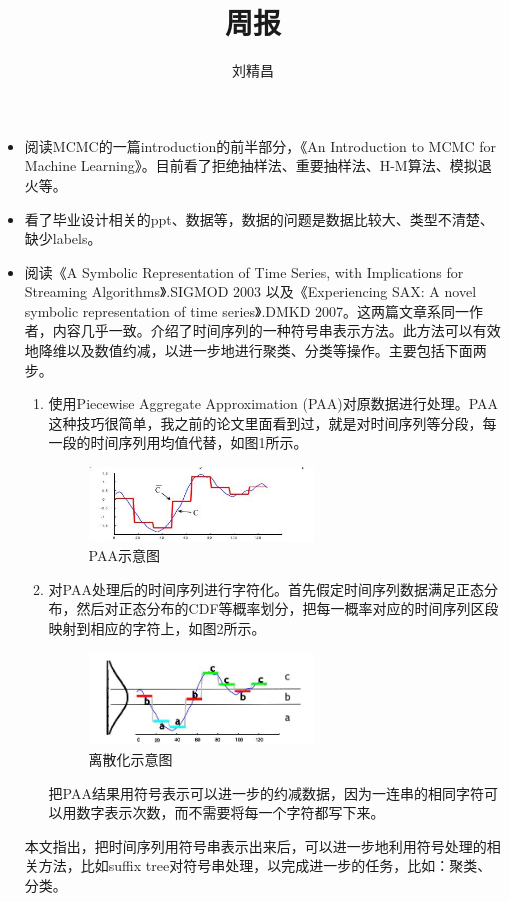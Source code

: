 \documentclass{ctexart}
\begin{document}
\heiti
\title{周报} 
\author{刘精昌}
\maketitle

\fangsong
\begin{itemize}
  \item 阅读MCMC的一篇introduction的前半部分，《An Introduction to MCMC for Machine Learning》。目前看了拒绝抽样法、重要抽样法、H-M算法、模拟退火等。
  \item 看了毕业设计相关的ppt、数据等，数据的问题是数据比较大、类型不清楚、缺少labels。
  \item 阅读《A Symbolic Representation of Time Series, with Implications for Streaming Algorithms》.SIGMOD 2003 以及《Experiencing SAX: A novel symbolic representation of time series》.DMKD 2007。这两篇文章系同一作者，内容几乎一致。介绍了时间序列的一种符号串表示方法。此方法可以有效地降维以及数值约减，以进一步地进行聚类、分类等操作。主要包括下面两步。
      \begin{enumerate}
        \item 使用Piecewise Aggregate Approximation (PAA)对原数据进行处理。PAA这种技巧很简单，我之前的论文里面看到过，就是对时间序列等分段，每一段的时间序列用均值代替，如图1所示。
        \begin{figure}
          \centering
          \includegraphics[width=0.6\textwidth]{1.jpg}
          \caption{PAA示意图}\label{figure:a}
        \end{figure}
            
        \item 对PAA处理后的时间序列进行字符化。首先假定时间序列数据满足正态分布，然后对正态分布的CDF等概率划分，把每一概率对应的时间序列区段映射到相应的字符上，如图2所示。
        \begin{figure}
          \centering
          \includegraphics[width=0.6\textwidth]{2.jpg}
          \caption{离散化示意图}\label{figure:b}
        \end{figure}
        把PAA结果用符号表示可以进一步的约减数据，因为一连串的相同字符可以用数字表示次数，而不需要将每一个字符都写下来。
      \end{enumerate}
      本文指出，把时间序列用符号串表示出来后，可以进一步地利用符号处理的相关方法，比如suffix tree对符号串处理，以完成进一步的任务，比如：聚类、分类。
\end{itemize}
\end{document}
